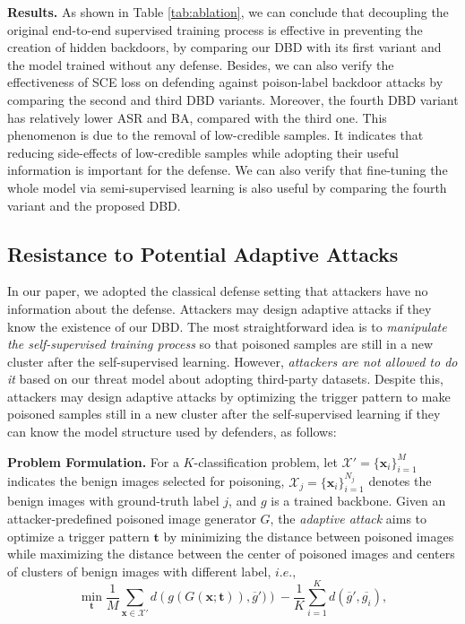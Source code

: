 \noindent \textbf{Results. }
As shown in Table \ref{tab:ablation}, we can conclude that decoupling the original end-to-end supervised training process is effective in preventing the creation of hidden backdoors, by comparing our DBD with its first variant and the model trained without any defense. Besides, we can also verify the effectiveness of SCE loss on defending against poison-label backdoor attacks by comparing the second and third DBD variants. Moreover, the fourth DBD variant has relatively lower ASR and BA, compared with the third one. This phenomenon is due to the removal of low-credible samples. It indicates that reducing side-effects of low-credible samples while adopting their useful information is important for the defense. We can also verify that fine-tuning the whole model via semi-supervised learning is also useful by comparing the fourth variant and the proposed DBD.

\subsection{Resistance to Potential Adaptive Attacks}
\label{sec:adaptive}

In our paper, we adopted the classical defense setting that attackers have no information about the defense. Attackers may design adaptive attacks if they know the existence of our DBD. The most straightforward idea is to \emph{manipulate the self-supervised training process} so that poisoned samples are still in a new cluster after the self-supervised learning. However, \emph{attackers are not allowed to do it} based on our threat model about adopting third-party datasets. Despite this, attackers may design adaptive attacks by optimizing the trigger pattern to make poisoned samples still in a new cluster after the self-supervised learning if they can know the model structure used by defenders, as follows:

\noindent \textbf{Problem Formulation.} For a $K$-classification problem, let $\mathcal{X}'=\{\bm{x}_i\}_{i=1}^M$ indicates the benign images selected for poisoning,  $\mathcal{X}_{j}=\{\bm{x}_i\}_{i=1}^{N_j}$ denotes the benign images with ground-truth label $j$, and $g$ is a trained backbone. Given an attacker-predefined poisoned image generator $G$, the \emph{adaptive attack} aims to optimize a trigger pattern $\bm{t}$ by minimizing the distance between poisoned images while maximizing the distance between the center of poisoned images and centers of clusters of benign images with different label, $i.e.,$
\begin{equation}
\min_{\bm{t}} \frac{1}{M}\sum_{\bm{x} \in \mathcal{X}'} d\left(g(G(\bm{x};\bm{t})), \overline{g}')\right) - \frac{1}{K}\sum_{i=1}^K d\left(\overline{g}', \overline{g_{i}}\right),     
\end{equation}
    
